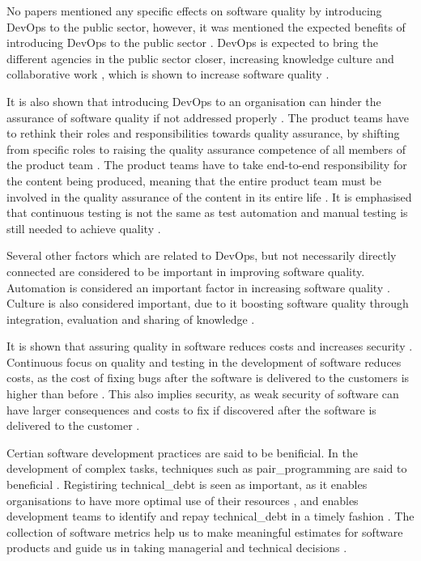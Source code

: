 No papers mentioned any specific effects on software quality by introducing DevOps to the public sector, however, it was mentioned the expected benefits of introducing DevOps to the public sector \cite{mm_2021}. DevOps is expected to bring the different agencies in the public sector closer, increasing knowledge culture and collaborative work \cite{mm_2021}, which is shown to increase software quality \cite{smm_2018}.

It is also shown that introducing DevOps to an organisation can hinder the assurance of software quality if not addressed properly \cite{dsc_2019}. The product teams have to rethink their roles and responsibilities towards quality assurance, by shifting from specific roles to raising the quality assurance competence of all members of the product team \cite{dsc_2019}. The product teams have to take end-to-end responsibility for the content being produced, meaning that the entire product team must be involved in the quality assurance of the content in its entire life \cite{dsc_2019}. It is emphasised that continuous testing is not the same as test automation and manual testing is still needed to achieve quality \cite{dsc_2019}.

Several other factors which are related to DevOps, but not necessarily directly connected are considered to be important in improving software quality. Automation is considered an important factor in increasing software quality \cite{smm_2018}. Culture is also considered important, due to it boosting software quality through integration, evaluation and sharing of knowledge \cite{smm_2018}.

It is shown that assuring quality in software reduces costs and increases security \cite{csw_2011}. Continuous focus on quality and testing in the development of software reduces costs, as the cost of fixing bugs after the software is delivered to the customers is higher than before \cite{csw_2011}. This also implies security, as weak security of software can have larger consequences and costs to fix if discovered after the software is delivered to the customer \cite{csw_2011}. 

Certian software development practices are said to be benificial. In the development of complex tasks, techniques such as \gls{pair_programming} are said to beneficial \cite{jeh_2009}. Registiring \gls{technical_debt} is seen as important, as it enables organisations to have more optimal use of their resources \cite{mv_2022}, and enables development teams to identify and repay \gls{technical_debt} in a timely fashion \cite{mv_2022}. The collection of software metrics help us to make meaningful estimates for software products and guide us in taking managerial and technical decisions \cite{jkc_2010}.

